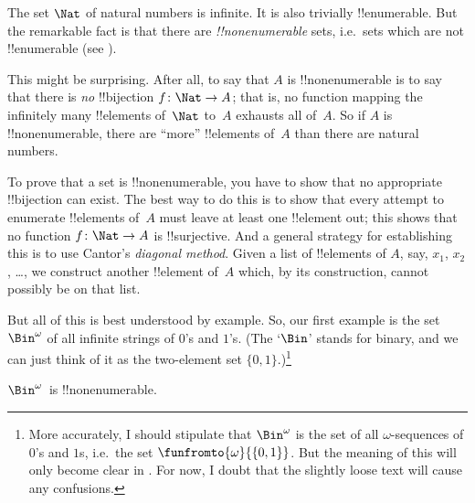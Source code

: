 \documentclass[../../../include/open-logic-section]{subfiles}
\begin{document}

\begin{explain}
The set $\Nat$ of natural numbers is 
infinite. It is also trivially !!{enumerable}. But the remarkable fact is that there are \emph{!!{nonenumerable}} sets, i.e.\ sets which are not !!{enumerable} (see ).

This might be surprising. After all, to say that $A$ is !!{nonenumerable} is to say that there is \emph{no} !!{bijection} $f \colon \Nat \to A$; that is, no function
mapping the infinitely many !!{element}s of~$\Nat$ to~$A$ exhausts all of~$A$.  So if $A$ is !!{nonenumerable}, there are ``more'' !!{element}s of~$A$ than there are natural numbers.

To prove that a set is !!{nonenumerable}, you have to show
that no appropriate !!{bijection} can exist. The best way to do this is to show that every attempt to enumerate 
!!{element}s of~$A$ must leave at least one !!{element} out; this shows that no
function $f\colon \Nat \to A$ is !!{surjective}. And a general strategy for establishing this is to use Cantor's \emph{diagonal method}. Given a list of !!{element}s
of $A$, say, $x_1$, $x_2$, \dots, we construct another !!{element} of~$A$
which, by its construction, cannot possibly be on that list.

But all of this is best understood by example. So, our first example is the set~$\Bin^\omega$ of all infinite strings of $0$'s and $1$'s. (The `$\Bin$' stands for binary, and we can just think of it as the two-element set $\{0,1\}$.)\footnote{More accurately, I should stipulate that $\Bin^\omega$ is the set of all $\omega$-sequences of $0$'s and $1$s, i.e.\ the set $\funfromto{\omega}{\{0,1\}}$. But the meaning of this will only become clear in . For now, I doubt that the slightly loose text will cause any confusions.}
\end{explain}
\begin{thm}
$\Bin^\omega$~is !!{nonenumerable}.
\end{thm}
\end{document}
